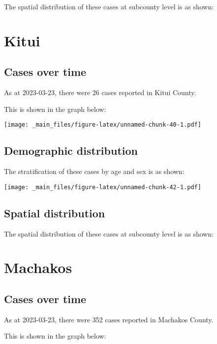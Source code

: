 \documentclass[
]{book}
\begin{document}
The spatial distribution of these cases at subcounty level is as shown:

\hypertarget{kitui}{%
\chapter{Kitui}\label{kitui}}

\hypertarget{cases-over-time-6}{%
\section{Cases over time}\label{cases-over-time-6}}

As at 2023-03-23, there were 26 cases reported in Kitui County.

This is shown in the graph below:

\texttt{[image: \_main\_files/figure-latex/unnamed-chunk-40-1.pdf]}

\hypertarget{demographic-distribution-6}{%
\section{Demographic distribution}\label{demographic-distribution-6}}

The stratification of these cases by age and sex is as shown:

\texttt{[image: \_main\_files/figure-latex/unnamed-chunk-42-1.pdf]}

\hypertarget{spatial-distribution-6}{%
\section{Spatial distribution}\label{spatial-distribution-6}}

The spatial distribution of these cases at subcounty level is as shown:

\hypertarget{machakos}{%
\chapter{Machakos}\label{machakos}}

\hypertarget{cases-over-time-7}{%
\section{Cases over time}\label{cases-over-time-7}}

As at 2023-03-23, there were 352 cases reported in Machakos County.

This is shown in the graph below:
\end{document}
